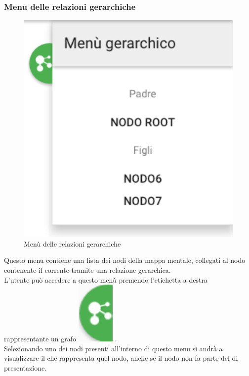 \subsubsection{Menu delle relazioni gerarchiche}
\begin{figure}[H]
\centering
\includegraphics[scale=0.5]{immagini/menuGerarchico.pdf}
\caption{Menù delle relazioni gerarchiche}
\end{figure}
Questo menu contiene una lista dei nodi della mappa mentale, collegati al nodo contenente il  corrente tramite una relazione gerarchica.\\
L'utente può accedere a questo menù premendo l'etichetta a destra rappresentante un grafo \includegraphics[scale=0.5]{immagini/grafo.pdf} .\\
Selezionando uno dei nodi presenti all'interno di questo menu si andrà a visualizzare il  che rappresenta quel nodo, anche se il nodo non fa parte del  di presentazione.
